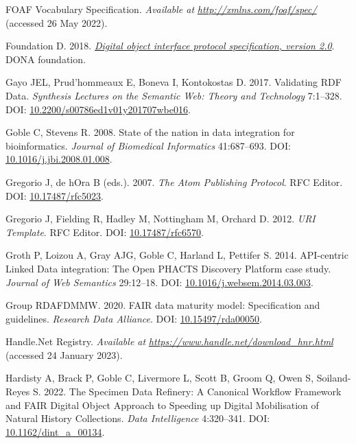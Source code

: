 \begin{CSLReferences}{1}{0}
\leavevmode{}%
FOAF Vocabulary Specification. \emph{Available at} \href{http://xmlns.com/foaf/spec/}{\emph{http://xmlns.com/foaf/spec/}} (accessed 26 May 2022).

\leavevmode{}%
Foundation D. 2018. \emph{\href{https://hdl.handle.net/0.DOIP/DOIPV2.0}{Digital object interface protocol specification, version 2.0}}. DONA foundation.

\leavevmode{}%
Gayo JEL, Prud'hommeaux E, Boneva I, Kontokostas D. 2017. Validating RDF Data. \emph{Synthesis Lectures on the Semantic Web: Theory and Technology} 7:1--328. DOI: \href{https://doi.org/10.2200/s00786ed1v01y201707wbe016}{10.2200/s00786ed1v01y201707wbe016}.

\leavevmode{}%
Goble C, Stevens R. 2008. State of the nation in data integration for bioinformatics. \emph{Journal of Biomedical Informatics} 41:687--693. DOI: \href{https://doi.org/10.1016/j.jbi.2008.01.008}{10.1016/j.jbi.2008.01.008}.

\leavevmode{}%
Gregorio J, de hOra B (eds.). 2007. \emph{The Atom Publishing Protocol}. RFC Editor. DOI: \href{https://doi.org/10.17487/rfc5023}{10.17487/rfc5023}.

\leavevmode{}%
Gregorio J, Fielding R, Hadley M, Nottingham M, Orchard D. 2012. \emph{URI Template}. RFC Editor. DOI: \href{https://doi.org/10.17487/rfc6570}{10.17487/rfc6570}.

\leavevmode{}%
Groth P, Loizou A, Gray AJG, Goble C, Harland L, Pettifer S. 2014. API-centric Linked Data integration: The Open PHACTS Discovery Platform case study. \emph{Journal of Web Semantics} 29:12--18. DOI: \href{https://doi.org/10.1016/j.websem.2014.03.003}{10.1016/j.websem.2014.03.003}.

\leavevmode{}%
Group RDAFDMMW. 2020. FAIR data maturity model: Specification and guidelines. \emph{Research Data Alliance}. DOI: \href{https://doi.org/10.15497/rda00050}{10.15497/rda00050}.

\leavevmode{}%
Handle.Net Registry. \emph{Available at} \href{https://www.handle.net/download_hnr.html}{\emph{https://www.handle.net/download\_hnr.html}} (accessed 24 January 2023).

\leavevmode{}%
Hardisty A, Brack P, Goble C, Livermore L, Scott B, Groom Q, Owen S, Soiland-Reyes S. 2022. The Specimen Data Refinery: A Canonical Workflow Framework and FAIR
Digital Object Approach to Speeding up Digital Mobilisation of Natural History
Collections. \emph{Data Intelligence} 4:320--341. DOI: \href{https://doi.org/10.1162/dint_a_00134}{10.1162/dint\_a\_00134}.


\end{CSLReferences}
